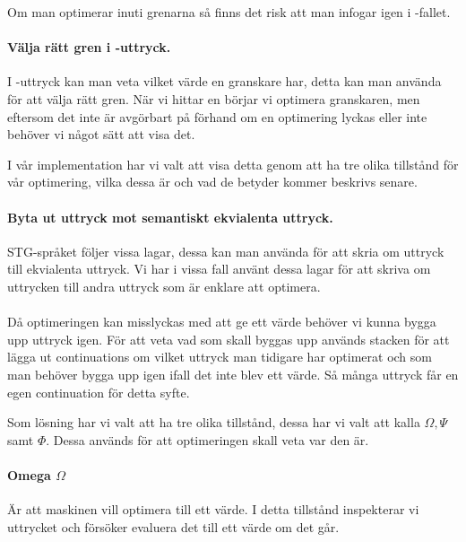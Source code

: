 \documentclass[Rapport]{subfiles}
\begin{document}
Om man optimerar  inuti grenarna så finns det risk att man infogar 
igen i -fallet.

\paragraph{ Välja rätt gren i -uttryck. }

I -uttryck kan man veta vilket värde en granskare har, detta kan man använda
för att välja rätt gren. När vi hittar en  börjar vi optimera granskaren,
men eftersom det inte är avgörbart på förhand om en optimering lyckas eller inte
behöver vi något sätt att visa det. 

I vår implementation har vi valt att visa detta genom att ha tre olika tillstånd
för vår optimering, vilka dessa är och vad de betyder kommer beskrivs senare.

\paragraph{ Byta ut uttryck mot semantiskt ekvialenta uttryck.}

STG-språket följer vissa lagar, dessa kan man använda för att skria om uttryck
till ekvialenta uttryck. Vi har i vissa fall använt dessa lagar för att skriva om
uttrycken till andra uttryck som är enklare att optimera.

\paragraph{}

Då optimeringen kan misslyckas med att ge ett värde behöver vi kunna bygga upp uttryck
igen. För att veta vad som skall byggas upp används stacken för att lägga ut continuations
om vilket uttryck man tidigare har optimerat och som man behöver bygga upp igen ifall det
inte blev ett värde. Så många uttryck får en egen continuation för detta syfte.



Som lösning har vi valt att ha tre olika tillstånd, dessa har vi valt att kalla
$\Omega, \Psi$ samt $\Phi$. Dessa används för att optimeringen skall veta var den
är. 

\paragraph{Omega $\Omega$} Är att maskinen vill optimera till ett värde. I detta tillstånd
inspekterar vi uttrycket och försöker evaluera det till ett värde om det går.
\end{document}
